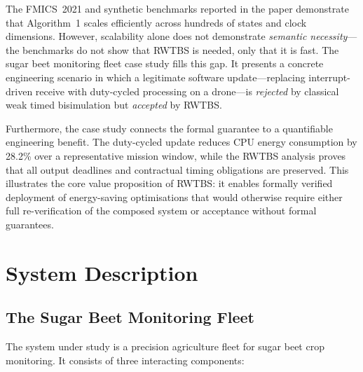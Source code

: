 \documentclass[11pt,a4paper]{article}
\newcommand{\RWTBS}{RWTBS}
\begin{document}
The FMICS~2021 and synthetic benchmarks reported in the paper demonstrate that
Algorithm~1 scales efficiently across hundreds of states and clock dimensions.
However, scalability alone does not demonstrate \emph{semantic necessity}---the
benchmarks do not show that \RWTBS{} is needed, only that it is fast.  The
sugar beet monitoring fleet case study fills this gap.  It presents a concrete
engineering scenario in which a legitimate software update---replacing
interrupt-driven receive with duty-cycled processing on a drone---is
\emph{rejected} by classical weak timed bisimulation but \emph{accepted} by
\RWTBS{}.

Furthermore, the case study connects the formal guarantee to a quantifiable
engineering benefit.  The duty-cycled update reduces CPU energy consumption by
28.2\% over a representative mission window, while the \RWTBS{} analysis
proves that all output deadlines and contractual timing obligations are
preserved.  This illustrates the core value proposition of \RWTBS{}: it
enables formally verified deployment of energy-saving optimisations that would
otherwise require either full re-verification of the composed system or
acceptance without formal guarantees.

\section{System Description}
\label{sec:system}

\subsection{The Sugar Beet Monitoring Fleet}
\label{sec:fleet}

The system under study is a precision agriculture fleet for sugar beet crop
monitoring.  It consists of three interacting components:
\end{document}
